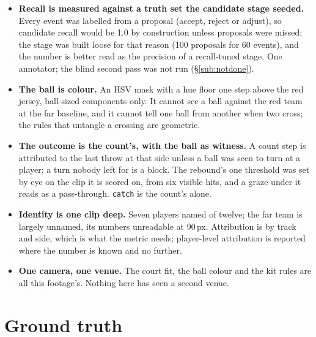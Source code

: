 \documentclass[10pt,a4paper]{article}
\begin{document}
\begin{itemize}
\item \textbf{Recall is measured against a truth set the candidate stage seeded.} Every
event was labelled from a proposal (accept, reject or adjust), so candidate recall would be
1.0 by construction unless proposals were missed; the stage was built loose for that reason
(100 proposals for 60 events), and the number is better read as the precision of a
recall-tuned stage. One annotator; the blind second pass was not run
(\S\ref{sub:notdone}).
\item \textbf{The ball is colour.} An HSV mask with a hue floor one step above the red
jersey, ball-sized components only. It cannot see a ball against the red team at the far
baseline, and it cannot tell one ball from another when two cross; the rules that untangle a
crossing are geometric.
\item \textbf{The outcome is the count's, with the ball as witness.} A count step is
attributed to the last throw at that side unless a ball was seen to turn at a player; a turn
nobody left for is a block. The rebound's one threshold was set by eye on the clip it is
scored on, from six visible hits, and a graze under it reads as a pass-through.
\texttt{catch} is the count's alone.
\item \textbf{Identity is one clip deep.} Seven players named of twelve; the far team is
largely unnamed, its numbers unreadable at 90\,px. Attribution is by track and side, which
is what the metric needs; player-level attribution is reported where the number is known and
no further.
\item \textbf{One camera, one venue.} The court fit, the ball colour and the kit rules are
all this footage's. Nothing here has seen a second venue.
\end{itemize}

\section{Ground truth}
\label{sec:truth}
\end{document}

